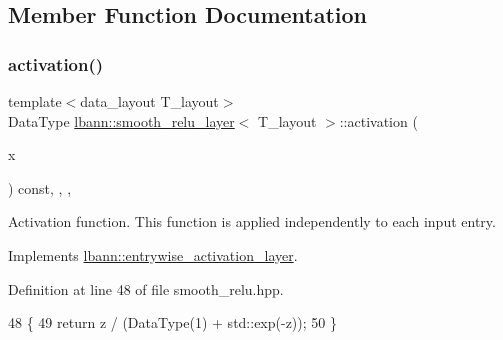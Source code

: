 \subsection{Member Function Documentation}
\mbox{\label{classlbann_1_1smooth__relu__layer_a7fa882bb89a244a5a4ccb6614815f1c6}} 
\subsubsection{\texorpdfstring{activation()}{activation()}}
{\footnotesize\ttfamily template$<$data\+\_\+layout T\+\_\+layout$>$ \\
Data\+Type \hyperlink{classlbann_1_1smooth__relu__layer}{lbann\+::smooth\+\_\+relu\+\_\+layer}$<$ T\+\_\+layout $>$\+::activation (\begin{DoxyParamCaption}\item[{Data\+Type}]{x }\end{DoxyParamCaption}) const\hspace{0.3cm}{\ttfamily [inline]}, {\ttfamily [override]}, {\ttfamily [protected]}, {\ttfamily [virtual]}}

Activation function. This function is applied independently to each input entry. 

Implements \hyperlink{classlbann_1_1entrywise__activation__layer_a69269401530a2112b66660383464bab9}{lbann\+::entrywise\+\_\+activation\+\_\+layer}.



Definition at line 48 of file smooth\+\_\+relu.\+hpp.


\begin{DoxyCode}
48                                                  \{
49     \textcolor{keywordflow}{return} z / (DataType(1) + std::exp(-z));
50   \}
\end{DoxyCode}
\mbox{\label{classlbann_1_1smooth__relu__layer_a44b4b163830213b9fb270e9ef2cc70ae}} 

